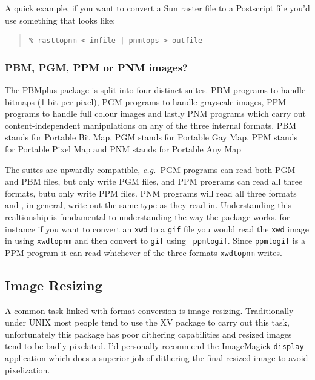 \documentclass[twoside,11pt]{article}
\newcommand{\htmlref}[2]{#1}
\newcommand{\xlabel}[1]{}
\begin{document}
A quick example, if you want to convert a Sun raster file to a
Postscript file you'd use something that looks like:

\small
\begin{quote}
\begin{verbatim}
% rasttopnm < infile | pnmtops > outfile
\end{verbatim}
\end{quote}
\normalsize

\subsubsection{PBM, PGM, PPM or PNM images?}

The PBMplus package is split into four distinct suites. PBM programs
to handle bitmaps (1 bit per pixel), PGM programs to handle grayscale
images, PPM programs to handle full colour images and lastly PNM
programs which carry out content-independent manipulations on any of
the three internal formats. PBM stands for Portable Bit Map, PGM
stands for Portable Gay Map, PPM stands for Portable Pixel Map and PNM
stands for Portable Any Map

The suites are upwardly compatible, {\em e.g.\ }PGM programs can read
both PGM and PBM files, but only write PGM files, and PPM programs can
read all three formats, butu only write PPM files. PNM programs will
read all three formats and , in general, write out the same type as
they read in. Understanding this realtionship is fundamental to
understanding the way the package works. for instance if you want to
convert an {\tt xwd} to a {\tt gif} file you would read the {\tt xwd}
image in using {\tt xwdtopnm} and then convert to {\tt gif} using {\tt
ppmtogif}. Since {\tt ppmtogif} is a PPM program it can read whichever
of the three formats {\tt xwdtopnm} writes.

\subsection{\xlabel{sc15_resizing}Image Resizing\label{sc15_resizing}}

A common task linked with format conversion is image resizing.
Traditionally under UNIX most people tend to use the
\htmlref{XV}{sc15_xv} package to carry out this task, unfortunately
this package has poor dithering capabilities and resized images tend
to be badly pixelated. I'd personally recommend the
\htmlref{ImageMagick}{sc15_magick} {\tt display} application which
does a superior job of dithering the final resized image to avoid
pixelization.
\end{document}
